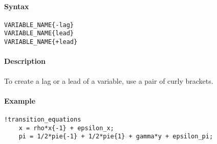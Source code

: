 


	\paragraph{Syntax}

\begin{verbatim}
VARIABLE_NAME{-lag}
VARIABLE_NAME{lead}
VARIABLE_NAME{+lead}
\end{verbatim}

\paragraph{Description}

To create a lag or a lead of a variable, use a pair of curly brackets.

\paragraph{Example}

\begin{verbatim}
!transition_equations
    x = rho*x{-1} + epsilon_x;
    pi = 1/2*pie{-1} + 1/2*pie{1} + gamma*y + epsilon_pi;
\end{verbatim}


